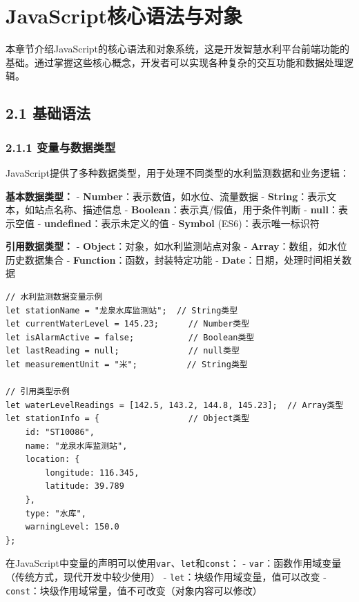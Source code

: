\section{JavaScript核心语法与对象}\label{javascriptux6838ux5fc3ux8bedux6cd5ux4e0eux5bf9ux8c61}

本章节介绍JavaScript的核心语法和对象系统，这是开发智慧水利平台前端功能的基础。通过掌握这些核心概念，开发者可以实现各种复杂的交互功能和数据处理逻辑。

\subsection{2.1 基础语法}\label{ux57faux7840ux8bedux6cd5}

\subsubsection{2.1.1
变量与数据类型}\label{ux53d8ux91cfux4e0eux6570ux636eux7c7bux578b}

JavaScript提供了多种数据类型，用于处理不同类型的水利监测数据和业务逻辑：

\textbf{基本数据类型：} - \textbf{Number}：表示数值，如水位、流量数据 -
\textbf{String}：表示文本，如站点名称、描述信息 -
\textbf{Boolean}：表示真/假值，用于条件判断 - \textbf{null}：表示空值 -
\textbf{undefined}：表示未定义的值 - \textbf{Symbol}
(ES6)：表示唯一标识符

\textbf{引用数据类型：} - \textbf{Object}：对象，如水利监测站点对象 -
\textbf{Array}：数组，如水位历史数据集合 -
\textbf{Function}：函数，封装特定功能 -
\textbf{Date}：日期，处理时间相关数据

\begin{lstlisting}
// 水利监测数据变量示例
let stationName = "龙泉水库监测站";  // String类型
let currentWaterLevel = 145.23;      // Number类型
let isAlarmActive = false;           // Boolean类型
let lastReading = null;              // null类型
let measurementUnit = "米";          // String类型

// 引用类型示例
let waterLevelReadings = [142.5, 143.2, 144.8, 145.23];  // Array类型
let stationInfo = {                  // Object类型
    id: "ST10086",
    name: "龙泉水库监测站",
    location: {
        longitude: 116.345,
        latitude: 39.789
    },
    type: "水库",
    warningLevel: 150.0
};
\end{lstlisting}

在JavaScript中变量的声明可以使用\passthrough{\lstinline!var!}、\passthrough{\lstinline!let!}和\passthrough{\lstinline!const!}：
-
\passthrough{\lstinline!var!}：函数作用域变量（传统方式，现代开发中较少使用）
- \passthrough{\lstinline!let!}：块级作用域变量，值可以改变 -
\passthrough{\lstinline!const!}：块级作用域常量，值不可改变（对象内容可以修改）

